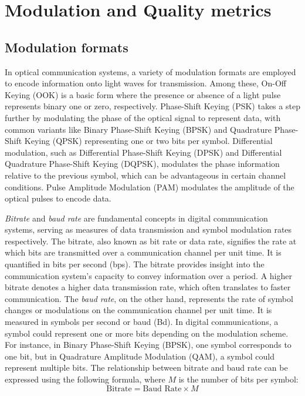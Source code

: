 \section{Modulation and Quality metrics}

\subsection{Modulation formats}

In optical communication systems, a variety of modulation formats are employed to encode information onto light waves for transmission. Among these, On-Off Keying (OOK) is a basic form where the presence or absence of a light pulse represents binary one or zero, respectively. Phase-Shift Keying (PSK) takes a step further by modulating the phase of the optical signal to represent data, with common variants like Binary Phase-Shift Keying (BPSK) and Quadrature Phase-Shift Keying (QPSK) representing one or two bits per symbol. Differential modulation, such as Differential Phase-Shift Keying (DPSK) and Differential Quadrature Phase-Shift Keying (DQPSK), modulates the phase information relative to the previous symbol, which can be advantageous in certain channel conditions. Pulse Amplitude Modulation (PAM) modulates the amplitude of the optical pulses to encode data.

\textit{Bitrate} and \textit{baud rate} are fundamental concepts in digital communication systems, serving as measures of data transmission and symbol modulation rates respectively. The bitrate, also known as bit rate or data rate, signifies the rate at which bits are transmitted over a communication channel per unit time. It is quantified in bits per second (bps). The bitrate provides insight into the communication system's capacity to convey information over a period. A higher bitrate denotes a higher data transmission rate, which often translates to faster communication. The \textit{baud rate}, on the other hand, represents the rate of symbol changes or modulations on the communication channel per unit time. It is measured in symbols per second or baud (Bd). In digital communications, a symbol could represent one or more bits depending on the modulation scheme. For instance, in Binary Phase-Shift Keying (BPSK), one symbol corresponds to one bit, but in Quadrature Amplitude Modulation (QAM), a symbol could represent multiple bits. The relationship between bitrate and baud rate can be expressed using the following formula, where $M$ is the number of bits per symbol:
\begin{equation}
\text{Bitrate} = \text{Baud Rate} \times M
\end{equation}

